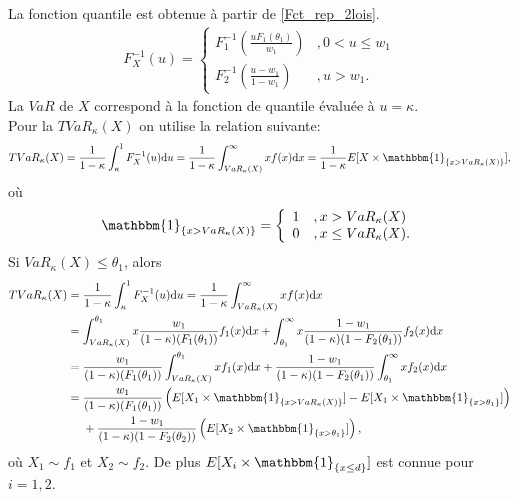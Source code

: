 	La fonction quantile est obtenue à partir de \ref{Fct_rep_2lois}.
	\begin{align}
		F_X^{-1}(u) = \left\{
		\begin{array}{ll}
			F_1^{-1} \left( \frac{u F_1(\theta_1)}{w_1} \right)& ,0 < u \leq w_1 \\
			F_2^{-1} \left( \frac{u-w_1}{1-w_1} \right)& ,u > w_1.
		\end{array}
		\right.
	\end{align}
	La $VaR$ de $X$ correspond à la fonction de quantile évaluée à $u=\kappa$.\\
	
	Pour la $TVaR_{\kappa}(X)$ on utilise la relation suivante:
	\begin{align}\label{Relations_TVaR}
	TVaR_{\kappa}(X) = \frac{1}{1-\kappa} \int_{\kappa}^{1} F_X^{-1}(u) \textrm{d}u = \frac{1}{1-\kappa} \int_{VaR_{\kappa}(X)}^{\infty} x f(x) \textrm{d}x = \frac{1}{1-\kappa} E[X \times \mathbbm{1}_{\left\{ x > VaR_{\kappa}(X) \right\}}],
	\end{align}
	où
	$$
		\mathbbm{1}_{\left\{ x > VaR_{\kappa}(X) \right\}} = \left\{
		\begin{array}{ll}
			1 & ,x > VaR_{\kappa}(X) \\
			0 & ,x \leq VaR_{\kappa}(X). \\
		\end{array}
		\right.
	$$
	Si $VaR_{\kappa}(X) \leq \theta_1$, alors
	\begin{align*}
		TVaR_{\kappa}(X) &= \frac{1}{1-\kappa} \int_{\kappa}^{1} F_X^{-1}(u) \textrm{d}u = \frac{1}{1-\kappa} \int_{VaR_{\kappa}(X)}^{\infty} x f(x) \textrm{d}x\\
		&=  \int_{VaR_{\kappa}(X)}^{\theta_1} x \frac{w_1}{(1-\kappa)(F_1(\theta_1))}f_1(x) \textrm{d}x + \int_{\theta_1}^{\infty} x  \frac{1-w_1}{(1-\kappa)(1-F_2(\theta_1))} f_2(x) \textrm{d}x\\
		&= \frac{w_1}{(1-\kappa)(F_1(\theta_1))} \int_{VaR_{\kappa}(X)}^{\theta_1} x f_1(x) \textrm{d}x + \frac{1-w_1}{(1-\kappa)(1-F_2(\theta_1))} \int_{\theta_1}^{\infty} x   f_2(x) \textrm{d}x\\
		&= \frac{w_1}{(1-\kappa)(F_1(\theta_1))} \left(E[X_1 \times \mathbbm{1}_{\left\{ x > VaR_{\kappa}(X)  \right\}}] - E[X_1 \times \mathbbm{1}_{\left\{ x > \theta_1\right\}}]  \right)\\
		&\ \ \ \ +  \frac{1-w_1}{(1-\kappa)(1-F_2(\theta_2))} \left( E[X_2 \times \mathbbm{1}_{\left\{ x > \theta_1 \right\}}]\right), \\
	\end{align*}	
	où $X_1\sim f_1$ et $X_2 \sim f_2$. De plus $E[X_i \times \mathbbm{1}_{\left\{ x \leq d \right\}} ]$ est connue pour $i=1,2$.\\
	
